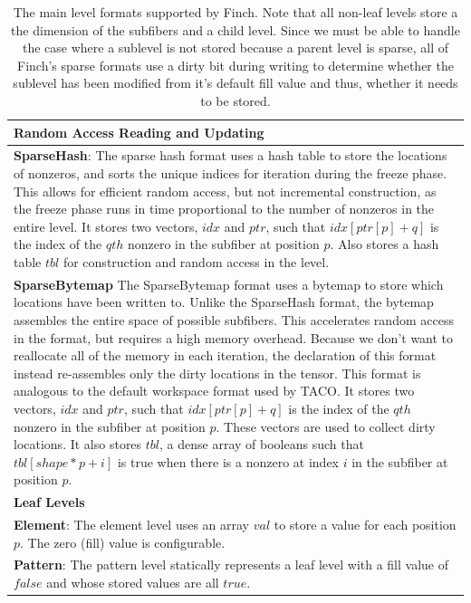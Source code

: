 \begin{table}[ht]
\begin{tabular}{p{14cm}}
    \hline
    \textbf{Random Access Reading and Updating} \\
    \hline
    \textbf{SparseHash}:
    The sparse hash format uses a hash table to store the locations of nonzeros, and sorts the unique indices for iteration during the freeze phase.
    This allows for efficient random access, but not incremental construction, as the freeze phase runs in time proportional to the number of nonzeros in the entire level.
    It stores two vectors, $idx$ and $ptr$, such that $idx[ptr[p] + q]$ is the index of the $qth$ nonzero in the subfiber at position $p$. 
    Also stores a hash table $tbl$ for construction and random access in the level. \\
    \textbf{SparseBytemap}
    The SparseBytemap format uses a bytemap to store which locations have been written to.
    Unlike the SparseHash format, the bytemap assembles the entire space of possible subfibers.
    This accelerates random access in the format, but requires a high memory overhead.
    Because we don't want to reallocate all of the memory in each iteration, the declaration of this format instead re-assembles only the dirty locations in the tensor.
    This format is analogous to the default workspace format used by TACO.
    It stores two vectors, $idx$ and $ptr$, such that $idx[ptr[p] + q]$ is the index of the $qth$ nonzero in the subfiber at position $p$.
    These vectors are used to collect dirty locations.
    It also stores $tbl$, a dense array of booleans such that $tbl[shape * p + i]$ is true when there is a nonzero at index $i$ in the subfiber at position $p$. \\
    \hline
    \textbf{Leaf Levels} \\
    \hline
    \textbf{Element}:
    The element level uses an array $val$ to store a value for each position $p$. The zero (fill) value is configurable.\\
    \textbf{Pattern}:
    The pattern level statically represents a leaf level with a fill value of $false$ and whose stored values are all $true$. \\
    \hline
    \end{tabular}
    \caption{The main level formats supported by Finch. Note that all non-leaf
    levels store a the dimension of the subfibers and a child level. Since we
    must be able to handle the case where a sublevel is not stored because a
    parent level is sparse, all of Finch's sparse formats use a dirty bit during
    writing to determine whether the sublevel has been modified from it's
    default fill value and thus, whether it needs to be stored.}
    \label{table:formats}
\end{table}
